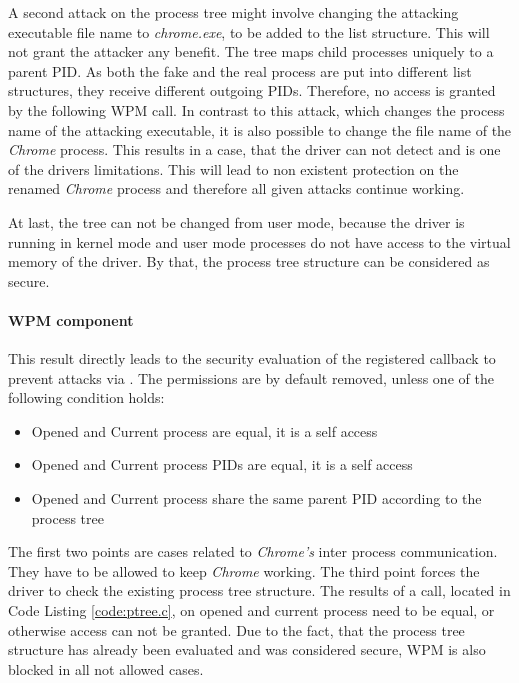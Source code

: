 A second attack on the process tree might involve changing the attacking executable file name to \emph{chrome.exe}, to be added to the list structure. This will not grant the attacker any benefit. The tree maps child processes uniquely to a parent \gls{PID}. As both the fake and the real process are put into different list structures, they receive different outgoing \glspl{PID}. Therefore, no access is granted by the following \gls{WPM} call. In contrast to this attack, which changes the process name of the attacking executable, it is also possible to change the file name of the \emph{Chrome} process. This results in a case, that the driver can not detect and is one of the drivers limitations. This will lead to non existent protection on the renamed \emph{Chrome} process and therefore all given attacks continue working.

At last, the tree can not be changed from user mode, because the driver is running in kernel mode and user mode processes do not have access to the virtual memory of the driver. By that, the process tree structure can be considered as secure.

\paragraph{WPM component}
This result directly leads to the security evaluation of the registered callback to prevent attacks via . The permissions are by default removed, unless one of the following condition holds:
\begin{itemize}
\item Opened and Current process are equal, it is a self access
\item Opened and Current process \glspl{PID} are equal, it is a self access
\item Opened and Current process share the same parent \gls{PID} according to the process tree
\end{itemize}
The first two points are cases related to \emph{Chrome's} inter process communication. They have to be allowed to keep \emph{Chrome} working. The third point forces the driver to check the existing process tree structure. The results of a  call, located in Code Listing \ref{code:ptree.c}, on opened and current process need to be equal, or otherwise access can not be granted. Due to the fact, that the process tree structure has already been evaluated and was considered secure, \gls{WPM} is also blocked in all not allowed cases. 

